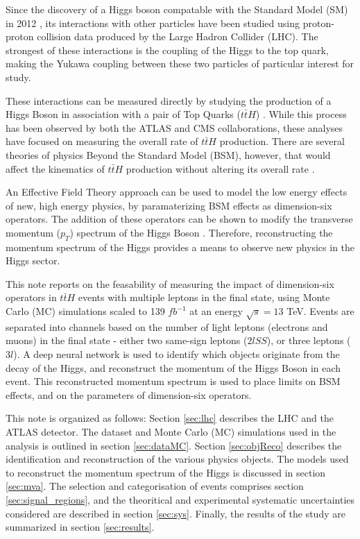 Since the discovery of a Higgs boson compatable with the Standard Model (SM) in 2012 \cite{}, its interactions with other particles have been studied using proton-proton collision data produced by the Large Hadron Collider (LHC). The strongest of these interactions is the coupling of the Higgs to the top quark, making the Yukawa coupling between these two particles of particular interest for study.

These interactions can be measured directly by studying the production of a Higgs Boson in association with a pair of Top Quarks ($t\bar{t}H$) \cite{}. While this process has been observed by both the ATLAS \cite{} and CMS \cite{} collaborations, these analyses have focused on measuring the overall rate of $t\bar{t}H$ production. There are several theories of physics Beyond the Standard Model (BSM), however, that would affect the kinematics of $t\bar{t}H$ production without altering its overall rate \cite{}.  

An Effective Field Theory approach can be used to model the low energy effects of new, high energy physics, by paramaterizing BSM effects as dimension-six operators. The addition of these operators can be shown to modify the transverse momentum ($p_T$) spectrum of the Higgs Boson \cite{}. Therefore, reconstructing the momentum spectrum of the Higgs provides a means to observe new physics in the Higgs sector.  

This note reports on the feasability of measuring the impact of dimension-six operators in $t\bar{t}H$ events with multiple leptons in the final state, using Monte Carlo (MC) simulations scaled to 139 $fb^{-1}$ at an energy $\sqrt{s} = 13$ TeV. Events are separated into channels based on the number of light leptons (electrons and muons) in the final state - either two same-sign leptons ($2lSS$), or three leptons ($3l$). A deep neural network is used to identify which objects originate from the decay of the Higgs, and reconstruct the momentum of the Higgs Boson in each event. This reconstructed momentum spectrum is used to place limits on BSM effects, and on the parameters of dimension-six operators.

This note is organized as follows: Section \ref{sec:lhc} describes the LHC and the ATLAS detector. The dataset and Monte Carlo (MC) simulations used in the analysis is outlined in section \ref{sec:dataMC}. Section \ref{sec:objReco} describes the identification and reconstruction of the various physics objects. The models used to reconstruct the momentum spectrum of the Higgs is discussed in section \ref{sec:mva}. The selection and categorisation of events comprises section \ref{sec:signal_regions}, and the theoritical and experimental systematic uncertainties considered are described in section \ref{sec:sys}. Finally, the results of the study are summarized in section \ref{sec:results}.
